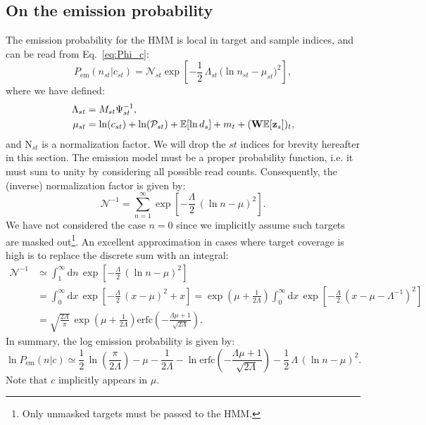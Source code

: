 \documentclass[nofootinbib,amssymb,amsmath]{revtex4}
\newcommand{\vz}{{\bf z}}
\newcommand{\vW}{{\bf W}}
\newcommand{\PP}{\mathcal{P}}
\newcommand{\EE}{\mathbb{E}}
\begin{document}
\subsection{On the emission probability}
The emission probability for the HMM is local in target and sample indices, and can be read from Eq.~\eqref{eq:Phi_c}:
\begin{equation}
P_\mathrm{em}(n_{st}|c_{st}) = \mathcal{N}_{st} \exp\left[- \frac{1}{2} \, \Lambda_{st} \, \big(\ln n_{st} - \mu_{st}\big)^2\right],
\end{equation}
where we have defined:
\begin{align}
\Lambda_{st} &= M_{st}\Psi_{st}^{-1},\nonumber\\
\mu_{st} &= \ln(c_{st}) + \ln(\PP_{st}) + \EE[\ln d_s] + m_t + (\vW \EE[\vz_s])_t,
\end{align}
and $\mathrm{N}_{st}$ is a normalization factor. We will drop the $st$ indices for brevity hereafter in this section. The emission model must be a proper probability function, i.e. it must sum to unity by considering all possible read counts. Consequently, the (inverse) normalization factor is given by:
\begin{equation}
\mathcal{N}^{-1} = \sum_{n=1}^\infty \exp\left[-\frac{\Lambda}{2}\,(\ln n - \mu)^2\right].
\end{equation}
We have not considered the case $n=0$ since we implicitly assume such targets are masked out\footnote{Only unmasked targets must be passed to the HMM.}. An excellent approximation in cases where target coverage is high is to replace the discrete sum with an integral:
\begin{align}
\mathcal{N}^{-1} &\simeq \int_{1}^\infty \mathrm{d}n\,\exp\left[-\frac{\Lambda}{2}\,(\ln n - \mu)^2\right]\nonumber\\
&= \int_{0}^\infty \mathrm{d}x \, \exp\left[-\frac{\Lambda}{2}\,(x - \mu)^2 + x\right] = \exp\left(\mu + \frac{1}{2\Lambda}\right)\int_{0}^\infty \mathrm{d}x \, \exp\left[-\frac{\Lambda}{2}\,(x - \mu - \Lambda^{-1})^2\right]\nonumber\\
&= \sqrt{\frac{2\Lambda}{\pi}}\,\exp\left(\mu + \frac{1}{2\Lambda}\right) \mathrm{erfc}\left(-\frac{\Lambda \mu + 1}{\sqrt{2\Lambda}}\right).
\end{align}
In summary, the log emission probability is given by:
\begin{equation}
\ln P_{\mathrm{em}}(n|c) \simeq \frac{1}{2}\,\ln\left(\frac{\pi}{2\Lambda}\right) - \mu - \frac{1}{2\Lambda} - \ln \mathrm{erfc}\left(-\frac{\Lambda \mu + 1}{\sqrt{2\Lambda}}\right) - \frac{1}{2}\,\Lambda\,(\ln n - \mu)^2.
\end{equation}
Note that $c$ implicitly appears in $\mu$.
\end{document}
